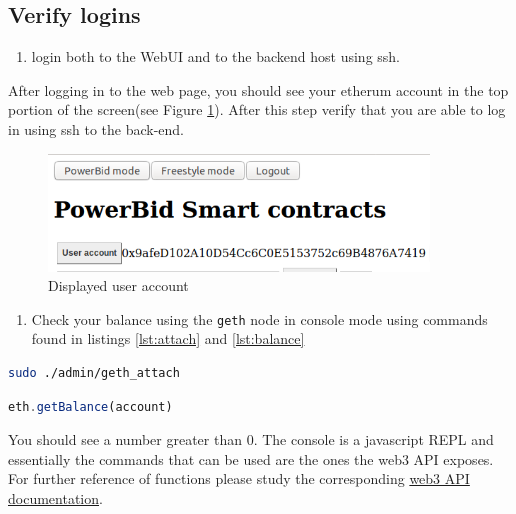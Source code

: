 \documentclass[a4paper]{article}
\begin{document}
\subsection{Verify logins}

\begin{enumerate}[label=\textbf{Task \arabic*}:, series=l_tasks]
\item login both to the WebUI and to the backend host using ssh.
\end{enumerate}

After logging in to the web page, you should see your etherum account in the top portion of the screen(see Figure \ref{fig:login-user-acc}). After this step verify that you are able to log in using ssh to the back-end.

\begin{figure}[H]
    \centering
    \includegraphics[width=0.9\textwidth]{figures/login-useracc.png}
    \caption{Displayed user account}
    \label{fig:login-user-acc}
\end{figure}

\begin{enumerate}[label=\textbf{Task \arabic*}:,l_tasks]
\item Check your balance using the \texttt{geth} node in console mode using commands found in listings \ref{lst:attach} and \ref{lst:balance}
\end{enumerate}

\begin{lstlisting}[language=bash,caption={attach to geth node},label={lst:attach}]
sudo ./admin/geth_attach 
\end{lstlisting}

\begin{lstlisting}[language=javascript,caption={Function for checking balance},label={lst:balance}]
eth.getBalance(account)
\end{lstlisting}

You should see a number greater than 0. The  console is a javascript REPL and essentially the commands that can be used are the ones the web3 API exposes. For further reference of functions please study the corresponding \href{https://web3js.readthedocs.io/en/v1.2.1/web3.html}{web3 API documentation}.
\end{document}
